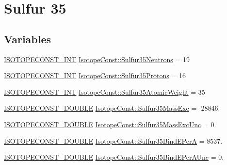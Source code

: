 \hypertarget{group___isotope_const-_sulfur-_s35}{}\section{Sulfur 35}
\label{group___isotope_const-_sulfur-_s35}
\subsection*{Variables}
\begin{DoxyCompactItemize}
\item 
\mbox{\hyperlink{group___isotope_const-_macros_ga5f18360b3e99483a35c32d789e62621c}{I\+S\+O\+T\+O\+P\+E\+C\+O\+N\+S\+T\+\_\+\+I\+NT}} \mbox{\hyperlink{group___isotope_const-_sulfur-_s35_ga2508463eaa90e21ffc45869a3d39a189}{Isotope\+Const\+::\+Sulfur35\+Neutrons}} = 19
\item 
\mbox{\hyperlink{group___isotope_const-_macros_ga5f18360b3e99483a35c32d789e62621c}{I\+S\+O\+T\+O\+P\+E\+C\+O\+N\+S\+T\+\_\+\+I\+NT}} \mbox{\hyperlink{group___isotope_const-_sulfur-_s35_gaaeb23ce37e0c634ccdbe516cf5332894}{Isotope\+Const\+::\+Sulfur35\+Protons}} = 16
\item 
\mbox{\hyperlink{group___isotope_const-_macros_ga5f18360b3e99483a35c32d789e62621c}{I\+S\+O\+T\+O\+P\+E\+C\+O\+N\+S\+T\+\_\+\+I\+NT}} \mbox{\hyperlink{group___isotope_const-_sulfur-_s35_gadf36c5708b417860e184c8eeb39167f6}{Isotope\+Const\+::\+Sulfur35\+Atomic\+Weight}} = 35
\item 
\mbox{\hyperlink{group___isotope_const-_macros_ga8f45a7272ce02c0b4c65c44636ed719a}{I\+S\+O\+T\+O\+P\+E\+C\+O\+N\+S\+T\+\_\+\+D\+O\+U\+B\+LE}} \mbox{\hyperlink{group___isotope_const-_sulfur-_s35_ga8b146be26b7bf7eec301e58349a10caa}{Isotope\+Const\+::\+Sulfur35\+Mass\+Exc}} = -\/28846.
\item 
\mbox{\hyperlink{group___isotope_const-_macros_ga8f45a7272ce02c0b4c65c44636ed719a}{I\+S\+O\+T\+O\+P\+E\+C\+O\+N\+S\+T\+\_\+\+D\+O\+U\+B\+LE}} \mbox{\hyperlink{group___isotope_const-_sulfur-_s35_ga89de3cc608e2633d7389c365ea7e1cf3}{Isotope\+Const\+::\+Sulfur35\+Mass\+Exc\+Unc}} = 0.
\item 
\mbox{\hyperlink{group___isotope_const-_macros_ga8f45a7272ce02c0b4c65c44636ed719a}{I\+S\+O\+T\+O\+P\+E\+C\+O\+N\+S\+T\+\_\+\+D\+O\+U\+B\+LE}} \mbox{\hyperlink{group___isotope_const-_sulfur-_s35_gab6336d74b0f63ccd4364d46bec0e0de0}{Isotope\+Const\+::\+Sulfur35\+Bind\+E\+PerA}} = 8537.
\item 
\mbox{\hyperlink{group___isotope_const-_macros_ga8f45a7272ce02c0b4c65c44636ed719a}{I\+S\+O\+T\+O\+P\+E\+C\+O\+N\+S\+T\+\_\+\+D\+O\+U\+B\+LE}} \mbox{\hyperlink{group___isotope_const-_sulfur-_s35_ga4d613de9cf0f3e8f00cd1c3f92b600cc}{Isotope\+Const\+::\+Sulfur35\+Bind\+E\+Per\+A\+Unc}} = 0.

\end{DoxyCompactItemize}
